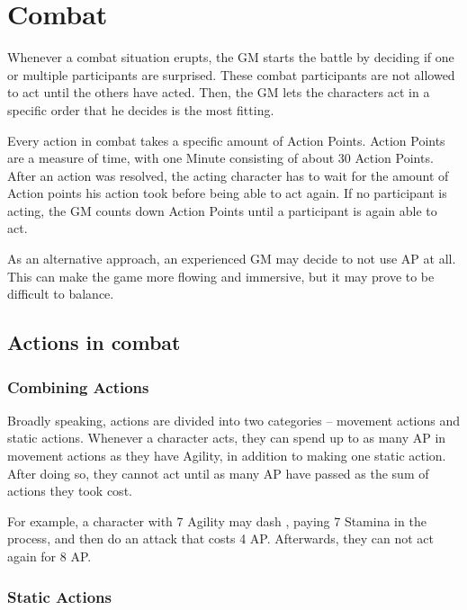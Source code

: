 
\chapter{Combat}
Whenever a combat situation erupts, the GM starts the battle by deciding if one or multiple participants are surprised.
These combat participants are not allowed to act until the others have acted.
Then, the GM lets the characters act in a specific order that he decides is the most fitting.

Every action in combat takes a specific amount of Action Points.
Action Points are a measure of time, with one Minute consisting of about 30 Action Points.
After an action was resolved, the acting character has to wait for the amount of Action points his action took before being able to act again.
If no participant is acting, the GM counts down Action Points until a participant is again able to act.

As an alternative approach, an experienced GM may decide to not use AP at all.
This can make the game more flowing and immersive, but it may prove to be difficult to balance.


\section{Actions in combat}

\subsection{Combining Actions}
Broadly speaking, actions are divided into two categories -- movement actions and static actions.
Whenever a character acts, they can spend up to as many AP in movement actions as they have Agility, in addition to making one static action.
After doing so, they cannot act until as many AP have passed as the sum of actions they took cost.

For example, a character with 7 Agility may dash , paying 7 Stamina in the process, and then do an attack that costs 4 AP.
Afterwards, they can not act again for 8 AP.

\subsection{Static Actions}

